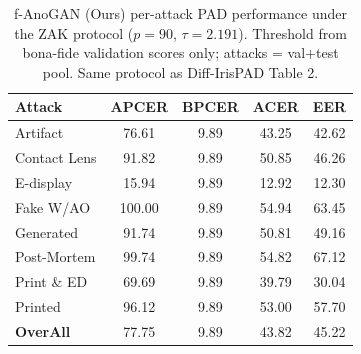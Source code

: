 \begin{table}[t]
\centering
\small
\caption{f-AnoGAN (Ours) per-attack PAD performance under the ZAK protocol ($p{=}90$, $\tau{=}2.191$). Threshold from bona-fide validation scores only; attacks = val+test pool. Same protocol as Diff-IrisPAD Table 2.}
\label{tab:fanogan_zak}
\begin{tabular}{lcccc}
\toprule
Attack & APCER & BPCER & ACER & EER \\
\midrule
Artifact & 76.61 & 9.89 & 43.25 & 42.62 \\
Contact Lens & 91.82 & 9.89 & 50.85 & 46.26 \\
E-display & 15.94 & 9.89 & 12.92 & 12.30 \\
Fake W/AO & 100.00 & 9.89 & 54.94 & 63.45 \\
Generated & 91.74 & 9.89 & 50.81 & 49.16 \\
Post-Mortem & 99.74 & 9.89 & 54.82 & 67.12 \\
Print \& ED & 69.69 & 9.89 & 39.79 & 30.04 \\
Printed & 96.12 & 9.89 & 53.00 & 57.70 \\
\midrule
\textbf{OverAll} & 77.75 & 9.89 & 43.82 & 45.22 \\
\bottomrule
\end{tabular}
\end{table}